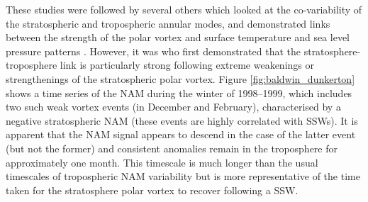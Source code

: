 These studies were followed by several others which looked at the co-variability
of the stratospheric and tropospheric annular modes, and demonstrated links
between the strength of the polar vortex and surface temperature and sea level
pressure patterns \citep{Perlwitz1995, Thompson1998,Baldwin1999}. However, it
was \citet{Baldwin2001a} who first demonstrated that the
stratosphere-troposphere link is particularly strong following extreme
weakenings or strengthenings of the stratospheric polar vortex. Figure
\ref{fig:baldwin_dunkerton} shows a time series of the NAM during the winter of
1998--1999, which includes two such weak vortex events (in December and
February), characterised by a negative stratospheric NAM (these events are
highly correlated with SSWs). It is apparent that the NAM signal appears to
descend in the case of the latter event (but not the former) and consistent
anomalies remain in the troposphere for approximately one month. This timescale
is much longer than the usual timescales of tropospheric NAM variability
\citep[e.g.,][]{Simpson2011} but is more representative of the time taken for
the stratosphere polar vortex to recover following a SSW.


